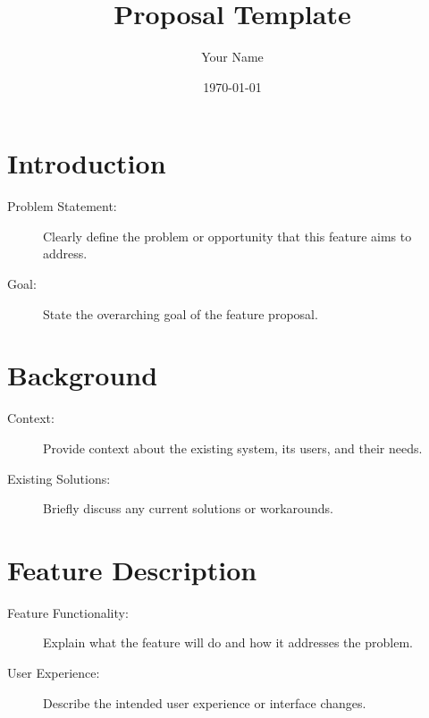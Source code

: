 \documentclass{article}
\title{Proposal Template}
\author{Your Name}
\date{\today}
\begin{document}
\maketitle

\section{Introduction}
\begin{description}
    \item[Problem Statement:] Clearly define the problem or opportunity that this feature aims to address.
    \item[Goal:] State the overarching goal of the feature proposal.
\end{description}

\section{Background}
\begin{description}
    \item[Context:] Provide context about the existing system, its users, and their needs.
    \item[Existing Solutions:] Briefly discuss any current solutions or workarounds.
\end{description}

\section{Feature Description}
\begin{description}
    \item[Feature Functionality:] Explain what the feature will do and how it addresses the problem.
    \item[User Experience:] Describe the intended user experience or interface changes.
\end{description}
\end{document}
